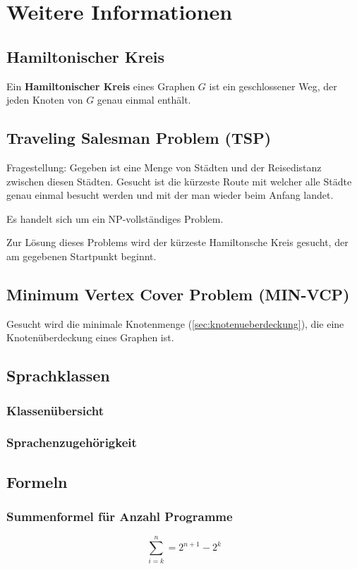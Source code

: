 \chapter{Weitere Informationen}
\section{Hamiltonischer Kreis}
Ein \textbf{Hamiltonischer Kreis} eines Graphen $G$ ist ein geschlossener Weg, der jeden Knoten von $G$ genau einmal enthält.

\section{Traveling Salesman Problem (TSP)}
Fragestellung: Gegeben ist eine Menge von Städten und der Reisedistanz zwischen diesen Städten. Gesucht ist die kürzeste Route mit welcher alle Städte genau einmal besucht werden und mit der man wieder beim Anfang landet.

Es handelt sich um ein NP-vollständiges Problem.

Zur Lösung dieses Problems wird der kürzeste Hamiltonsche Kreis gesucht, der am gegebenen Startpunkt beginnt.

\section{Minimum Vertex Cover Problem (MIN-VCP)}
Gesucht wird die minimale Knotenmenge (\ref{sec:knotenueberdeckung}), die eine Knotenüberdeckung eines Graphen ist.

\section{Sprachklassen}
\subsection{Klassenübersicht}

\subsection{Sprachenzugehörigkeit}

\section{Formeln}
\subsection{Summenformel für Anzahl Programme}
\[
\sum_{i = k}^n = 2^{n+1} - 2^k
\]